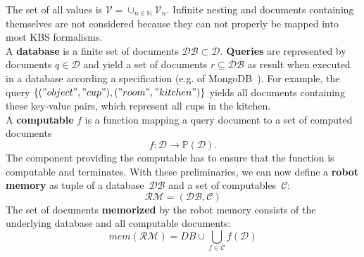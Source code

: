 The set of all values is $\mathcal{V}=\cup_{n\in\mathbb{N}}\mathcal{V}_n$.
  Infinite nesting and
documents containing themselves are not considered because they can
not properly be mapped into most KBS formalisms.
\\
A \textbf{database} is a finite set of documents $\mathcal{DB} \subset \mathcal{D}$.
\textbf{Queries} are represented by documents $q\in\mathcal{D}$ and yield a set
of documents $r\subseteq\mathcal{DB}$ as result when executed in a database according a
specification (e.g. of MongoDB~\cite{mongodb}). For example, the query
$\{("object","cup"),("room","kitchen")\}$ yields all documents containing these
key-value pairs, which represent all cups in the kitchen.
\\
A \textbf{computable} $f$ is a function mapping a query document to a
set of computed documents
$$f: \mathcal{D} \rightarrow \mathbb{P}(\mathcal{D})\text{.}$$
 The component providing the
computable has to ensure that the function is computable and
terminates.
%
With these preliminaries, we can now define a \textbf{robot memory} as tuple
of a database~$\mathcal{DB}$ and a set of computables~$\mathcal{C}$:
$$\mathcal{RM}=(\mathcal{DB},\mathcal{C})$$
%
The set of documents \textbf{memorized} by the robot memory consists
of the underlying database and all computable documents:
$$mem(\mathcal{RM})=DB \cup \bigcup_{f\in\mathcal{C}}f(\mathcal{D})$$

